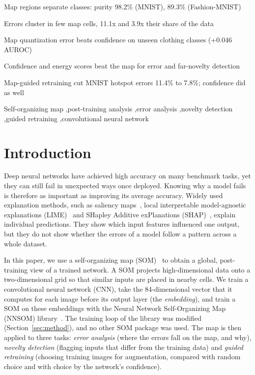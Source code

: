 \documentclass[preprint,review,12pt]{elsarticle}
\begin{document}
\begin{frontmatter}
\begin{highlights}
\item Map regions separate classes: purity 98.2\% (MNIST), 89.3\% (Fashion-MNIST)
\item Errors cluster in few map cells, 11.1x and 3.9x their share of the data
\item Map quantization error beats confidence on unseen clothing classes (+0.046 AUROC)
\item Confidence and energy scores beat the map for error and far-novelty detection
\item Map-guided retraining cut MNIST hotspot errors 11.4\% to 7.8\%; confidence did as well
\end{highlights}

\begin{keyword}
Self-organizing map \sep post-training analysis \sep error analysis \sep novelty detection \sep guided retraining \sep convolutional neural network
\end{keyword}

\end{frontmatter}
\linenumbers

\section{Introduction}\label{sec:intro}

Deep neural networks have achieved high accuracy on many benchmark tasks, yet they can still fail in unexpected ways once deployed. Knowing why a model fails is therefore as important as improving its average accuracy. Widely used explanation methods, such as saliency maps~\cite{simonyan2014saliency}, local interpretable model-agnostic explanations (LIME)~\cite{ribeiro2016lime} and SHapley Additive exPlanations (SHAP)~\cite{lundberg2017shap}, explain individual predictions. They show which input features influenced one output, but they do not show whether the errors of a model follow a pattern across a whole dataset.

In this paper, we use a self-organizing map (SOM)~\cite{kohonen1990som} to obtain a global, post-training view of a trained network. A SOM projects high-dimensional data onto a two-dimensional grid so that similar inputs are placed in nearby cells. We train a convolutional neural network (CNN), take the 84-dimensional vector that it computes for each image before its output layer (the \emph{embedding}), and train a SOM on these embeddings with the Neural Network Self-Organizing Map (NNSOM) library~\cite{jafari_nnsom}. The training loop of the library was modified (Section~\ref{sec:method}), and no other SOM package was used. The map is then applied to three tasks: \emph{error analysis} (where the errors fall on the map, and why), \emph{novelty detection} (flagging inputs that differ from the training data) and \emph{guided retraining} (choosing training images for augmentation, compared with random choice and with choice by the network's confidence).
\end{document}
